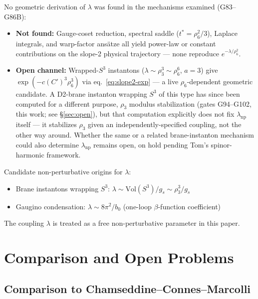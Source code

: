 \documentclass[12pt,a4paper]{article}
\newcommand{\Vol}{\mathrm{Vol}}
\begin{document}
No geometric derivation of $\lambda$ was found in the mechanisms examined (G83--G86B):
\begin{itemize}
  \item \textbf{Not found:} Gauge-coset reduction, spectral saddle ($t^*=\rho_6^2/3$),
        Laplace integrals, and warp-factor ans\"{a}tze all yield power-law or constant
        contributions on the slope-2 physical trajectory --- none reproduce
        $e^{-\lambda/\rho_6^2}$.
  \item \textbf{Open channel:} Wrapped-$S^3$ instantons
        ($\lambda\sim\rho_3^3\sim\rho_6^6$, $a=3$) give $\exp(-c(C')^3\rho_6^3)$
        via eq.~\eqref{eq:slope2-exp} --- a live $\rho_6$-dependent geometric candidate.
        A D2-brane instanton wrapping $S^3$ of this type has since been computed for a
        different purpose, $\rho_3$ modulus stabilization (gates G94--G102, this work; see
        \S\ref{sec:open}), but that computation explicitly does not fix $\lambda_{\mathrm{np}}$
        itself --- it stabilizes $\rho_3$ given an independently-specified coupling, not the
        other way around. Whether the same or a related brane-instanton mechanism could also
        determine $\lambda_{\mathrm{np}}$ remains open, on hold pending Tom's spinor-harmonic
        framework.
\end{itemize}
Candidate non-perturbative origins for $\lambda$:
\begin{itemize}
  \item Brane instantons wrapping $S^3$: $\lambda\sim\Vol(S^3)/g_s\sim\rho_3^3/g_s$
  \item Gaugino condensation: $\lambda\sim 8\pi^2/b_0$ (one-loop $\beta$-function coefficient)
\end{itemize}
The coupling $\lambda$ is treated as a free non-perturbative parameter in this paper.

\section{Comparison and Open Problems}
\label{sec:discussion}

\subsection{Comparison to Chamseddine--Connes--Marcolli \cite{CCM2006}}
\end{document}

